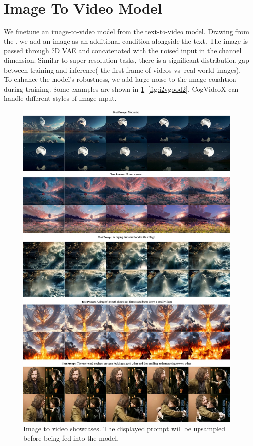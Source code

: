 \section{Image To Video Model}
We finetune an image-to-video model from the text-to-video model. Drawing from the \citep{blattmann2023stable}, we add an image as an additional condition alongside the text. The image is passed through 3D VAE and concatenated with the noised input in the channel dimension. Similar to super-resolution tasks, there is a significant distribution gap between training and inference( the first frame of videos vs. real-world images). To enhance the model's robustness, we add large noise to the image condition during training. Some examples are shown in \ref{fig:i2vgood1}, \ref{fig:i2vgood2}. CogVideoX can handle different styles of image input.

\begin{figure}[ht]
\begin{center}
\includegraphics[width=\linewidth]{images/t2v/i2vgood1.jpg}
\end{center}
\caption{Image to video showcases. The displayed prompt will be upsampled before being fed into the model.}
\label{fig:i2vgood1}
\end{figure}

